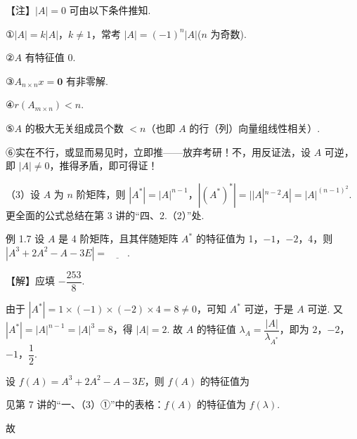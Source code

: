 \begin{fnote}
【注】$|A|=0$ 可由以下条件推知.

①$|A|=k|A|$，$k\neq 1$，常考 $|A|=(-1)^{n}|A|$($n$ 为奇数).

②$A$ 有特征值 0.

③$A_{n\times n}x=\mathbf{0}$ 有非零解.

④$r(A_{m\times n})<n$.

⑤$A$ 的极大无关组成员个数 $<n$（也即 $A$ 的行（列）向量组线性相关）.

⑥实在不行，或显而易见时，立即推——放弃考研！不，用反证法，设 $A$ 可逆，即 $|A|\neq 0$，推得矛盾，即可得证！
\end{fnote}

（3）设 $A$ 为 $n$ 阶矩阵，则 $|A^{*}|=|A|^{n-1}$，$|(A^{*})^{*}|=||A|^{n-2}A|=|A|^{(n-1)^{2}}$. 更全面的公式总结在第 3 讲的“四、2.（2）”处.

\begin{fcard}{例 1.7}
设 $A$ 是 4 阶矩阵，且其伴随矩阵 $A^{*}$ 的特征值为 1，$-1$，$-2$，4，则 $|A^{3}+2A^{2}-A-3E|=\underline{\qquad}$.

【解】应填 $-\dfrac{253}{8}$.


由于 $|A^{*}|=1\times(-1)\times(-2)\times4=8\neq 0$，可知 $A^{*}$ 可逆，于是 $A$ 可逆. 又 $|A^{*}|=|A|^{n-1}=|A|^{3}=8$，得 $|A|=2$. 故 $A$ 的特征值 $\lambda_A=\dfrac{|A|}{\lambda_{A^{*}}}$，即为 $2$，$-2$，$-1$，$\dfrac{1}{2}$.

设 $f(A)=A^{3}+2A^{2}-A-3E$，则 $f(A)$ 的特征值为

见第 7 讲的“一、（3）①”中的表格：$f(A)$ 的特征值为 $f(\lambda)$.

故
\end{fcard}

